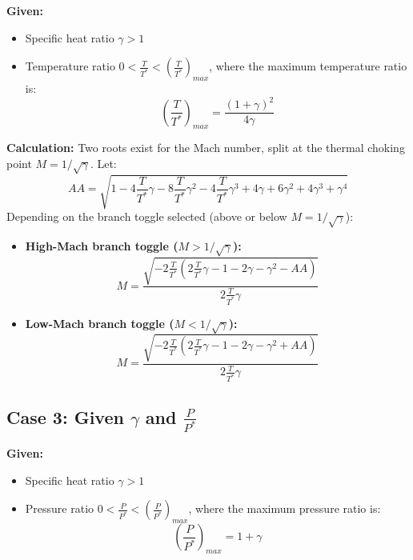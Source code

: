 \textbf{Given:}
\begin{itemize}[nosep]
    \item Specific heat ratio $\gamma > 1$
    \item Temperature ratio $0 < \frac{T}{T^*} < \left(\frac{T}{T^*}\right)_{max}$, where the maximum temperature ratio is:
    \begin{equation}
    \left(\frac{T}{T^*}\right)_{max} = \frac{(1+\gamma)^2}{4\gamma}
    \end{equation}
\end{itemize}

\textbf{Calculation:} Two roots exist for the Mach number, split at the thermal choking point $M = 1/\sqrt{\gamma}$. Let:
\begin{equation}
AA = \sqrt{1 - 4\frac{T}{T^*}\gamma - 8\frac{T}{T^*}\gamma^2 - 4\frac{T}{T^*}\gamma^3 + 4\gamma + 6\gamma^2 + 4\gamma^3 + \gamma^4}
\end{equation}
Depending on the branch toggle selected (above or below $M = 1/\sqrt{\gamma}$):
\begin{itemize}
    \item \textbf{High-Mach branch toggle ($M > 1/\sqrt{\gamma}$):}
    \begin{equation}
    M = \frac{\sqrt{-2\frac{T}{T^*}\left(2\frac{T}{T^*}\gamma - 1 - 2\gamma - \gamma^2 - AA\right)}}{2\frac{T}{T^*}\gamma}
    \end{equation}
    \item \textbf{Low-Mach branch toggle ($M < 1/\sqrt{\gamma}$):}
    \begin{equation}
    M = \frac{\sqrt{-2\frac{T}{T^*}\left(2\frac{T}{T^*}\gamma - 1 - 2\gamma - \gamma^2 + AA\right)}}{2\frac{T}{T^*}\gamma}
    \end{equation}
\end{itemize}


\subsection*{Case 3: Given $\gamma$ and $\frac{P}{P^*}$}

\textbf{Given:}
\begin{itemize}[nosep]
    \item Specific heat ratio $\gamma > 1$
    \item Pressure ratio $0 < \frac{P}{P^*} < \left(\frac{P}{P^*}\right)_{max}$, where the maximum pressure ratio is:
    \begin{equation}
    \left(\frac{P}{P^*}\right)_{max} = 1+\gamma
    \end{equation}
\end{itemize}

